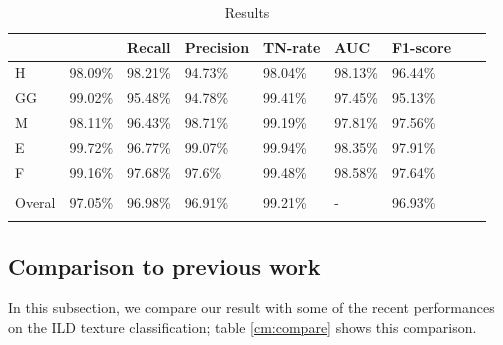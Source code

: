 \documentclass[conference]{IEEEtran}
\begin{document}
\begin{table}[tbh]
\caption{Results}
\label{cm:result}
\centering
\begin{tabular}{@{}lllllllll@{}}
\toprule
\multirow{0}{0.5cm}{} & \multirow{1}{0.8cm}{\centering{{Accuracy}}} & \multirow{1}{0.8cm}{Recall}&\multirow{1}{0.8cm}{Precision} & \multirow{1}{1cm}{TN-rate} & \multirow{1}{0.8cm}{AUC} & \multirow{1}{1cm}{F1-score} \\ \midrule

H & 98.09\% & 98.21\% & 94.73\% & 98.04\% & 98.13\% & 96.44\% \\ 
GG & 99.02\% & 95.48\% & 94.78\% & 99.41\% & 97.45\% & 95.13\% \\ 
M & 98.11\% & 96.43\% & 98.71\% & 99.19\% & 97.81\% & 97.56\% \\ 
E & 99.72\% & 96.77\% & 99.07\% & 99.94\% & 98.35\% & 97.91\% \\ 
F & 99.16\% & 97.68\% & 97.6\% & 99.48\% & 98.58\% & 97.64\% \\  \bottomrule
\vspace{-0.25cm} \\ 
Overal & 97.05\% & 96.98\% & 96.91\% & 99.21\% & - & 96.93\% \\ 
\vspace{-0.3cm} \\ 
\bottomrule

\end{tabular}
\end{table}


\subsection{\textbf{Comparison to previous work}}
In this subsection, we compare our result with some of the recent performances on the ILD texture classification; table \ref{cm:compare} shows this comparison.
\end{document}
